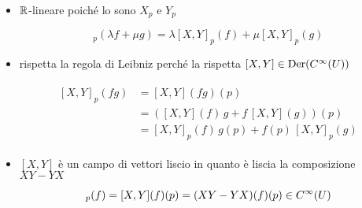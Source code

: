 \begin{itemize}
	\item $ \mathbb{R} $-lineare poiché lo sono $ X_{p} $ e $ Y_{p} $
	
	\begin{equation}
		[X,Y]_{p}(\lambda f + \mu g) = \lambda [X,Y]_{p}(f) + \mu [X,Y]_{p}(g)
	\end{equation}
	
	
	\item rispetta la regola di Leibniz perché la rispetta $ [X,Y] \in \operatorname{Der}(C^{\infty}(U)) $
	
	\begin{align}
		\begin{split}
			[X,Y]_{p}(fg) &= [X,Y](fg)(p) \\
			&= ([X,Y](f) \, g + f \, [X,Y](g))(p) \\
			&= [X,Y]_{p}(f) \, g(p) + f(p) \, [X,Y]_{p}(g)
		\end{split}
	\end{align}
	
	
	\item $ [X,Y] $ è un campo di vettori liscio in quanto è liscia la composizione $ XY-YX $
		
	\begin{equation}
		[X,Y]_{p}(f) = [X,Y](f)(p) %
		= (XY-YX)(f)(p) \in C^{\infty}(U) \\
	\end{equation}
\end{itemize}

